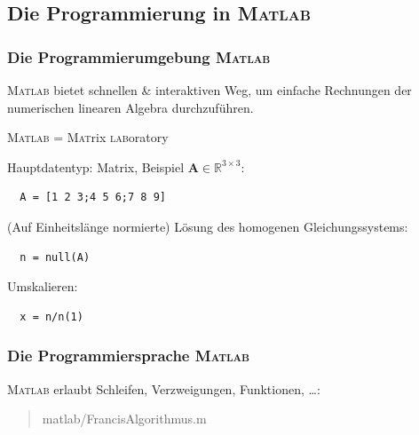 \documentclass[10pt]{beamer} %
\newcommand{\bfA}{{\mathbf A}}
\begin{document}
\subsection{Die Programmierung in \textsc{Matlab}}
\begin{frame}[fragile]
  \frametitle{Die Programmierumgebung \textsc{Matlab}}

  \textsc{Matlab} bietet schnellen \& interaktiven Weg, um einfache
  Rechnungen der numerischen linearen Algebra durchzuführen.

  \vspace*{1em}
  
  \textsc{Matlab} = \textsc{Mat}rix \textsc{lab}oratory

  \vspace*{1em}

  Hauptdatentyp: Matrix, Beispiel $\bfA\in\mathbb{R}^{3\times3}$:
\begin{verbatim}
  A = [1 2 3;4 5 6;7 8 9]
\end{verbatim}
  (Auf Einheitslänge normierte) Lösung des homogenen
  Gleichungssystems:
\begin{verbatim}
  n = null(A)
\end{verbatim}
  Umskalieren:
\begin{verbatim}
  x = n/n(1)
\end{verbatim}

\end{frame}
\begin{frame}
  \frametitle{Die Programmiersprache \textsc{Matlab}}

  \textsc{Matlab} erlaubt Schleifen, Verzweigungen, Funktionen, \ldots:
  \vspace*{-1em}

  \begin{quotation}
      {matlab/FrancisAlgorithmus.m}
  \end{quotation}

\end{frame}
\end{document}
